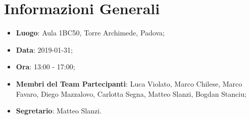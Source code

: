 \section{Informazioni Generali}

\begin{itemize}
	\item \textbf{Luogo}: Aula 1BC50, Torre Archimede, Padova; 
	\item \textbf{Data}: 2019-01-31; 
	\item \textbf{Ora}: 13:00 - 17:00; 
	\item \textbf{Membri del Team Partecipanti}: Luca Violato, Marco Chilese, Marco Favaro, Diego Mazzalovo, Carlotta Segna, Matteo Slanzi, Bogdan Stanciu; 
	\item \textbf{Segretario}: Matteo Slanzi. 
\end{itemize}